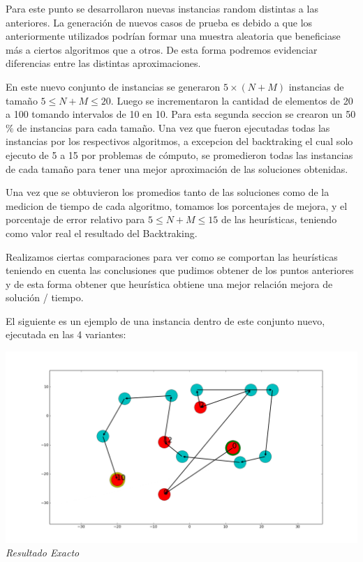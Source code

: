 Para este punto se desarrollaron nuevas instancias random distintas a las anteriores. La generación de nuevos casos de prueba es debido a que los anteriormente utilizados podrían formar una muestra aleatoria que beneficiase más a ciertos algoritmos que a otros. De esta forma podremos evidenciar diferencias entre las distintas aproximaciones.

En este nuevo conjunto de instancias se generaron $5 \times (N+M)$ instancias de tamaño $5 \leq N+M \leq 20$. Luego se incrementaron la cantidad de elementos de 20 a 100 tomando intervalos de 10 en 10. Para esta segunda seccion se crearon un 50$\%$ de instancias para cada tamaño.
Una vez que fueron ejecutadas todas las instancias por los respectivos algoritmos, a excepcion del backtraking el cual solo ejecuto de 5 a 15 por problemas de c\'omputo, se promedieron todas las instancias de cada tamaño para tener una mejor aproximaci\'on de las soluciones obtenidas. 

Una vez que se obtuvieron los promedios tanto de las soluciones como de la medicion de tiempo de cada algoritmo, tomamos los porcentajes de mejora, y el porcentaje de error relativo para $5 \leq N+M \leq 15$ de las heurísticas, teniendo como valor real el resultado del Backtraking.

Realizamos ciertas comparaciones para ver como se comportan las heurísticas teniendo en cuenta las conclusiones que pudimos obtener de los puntos anteriores y de esta forma obtener que heurística obtiene una mejor relación mejora de solución / tiempo.

El siguiente es un ejemplo de una instancia dentro de este conjunto nuevo, ejecutada en las 4 variantes:

 
    \vspace*{0.3cm} \vspace*{0.3cm}
  \begin{center}
\includegraphics[scale=0.3]{./EJ5/caminoExacto.png}
\\{\textit{Resultado Exacto}}
  \end{center}
  \vspace*{0.3cm}

